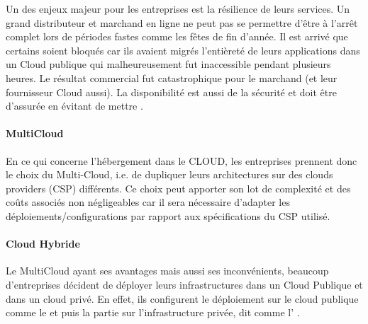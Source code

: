 Un des enjeux majeur pour les entreprises est la résilience de leurs services. Un grand distributeur et marchand en ligne ne peut pas se permettre d'être à l'arrêt complet lors de périodes fastes comme les fêtes de fin d'année. Il est arrivé que certains soient bloqués car ils avaient migrés l'entièreté de leurs applications dans un Cloud publique qui malheureusement fut inaccessible pendant plusieurs heures. Le résultat commercial fut catastrophique pour le marchand (et leur fournisseur Cloud aussi). 
La disponibilité est aussi de la sécurité et doit être d'assurée en évitant de mettre .
\paragraph{MultiCloud}
En ce qui concerne l'hébergement dans le CLOUD, les entreprises prennent donc le choix du Multi-Cloud, i.e. de dupliquer leurs architectures sur des clouds providers (CSP) différents. Ce choix peut apporter son lot de complexité et des coûts associés non négligeables car il sera nécessaire d'adapter les déploiements/configurations par rapport aux spécifications du CSP utilisé.
\paragraph{Cloud Hybride}
Le MultiCloud ayant ses avantages mais aussi ses inconvénients, beaucoup d'entreprises décident de déployer leurs infrastructures dans un Cloud Publique et dans un cloud privé. En effet, ils configurent le déploiement sur le cloud publique comme le  et puis la partie sur l'infrastructure privée, dit  comme l' .


